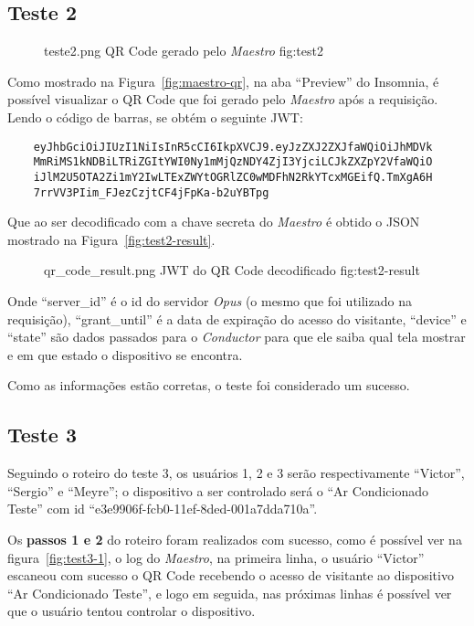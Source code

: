 \subsection{Teste 2}
\begin{figure}[h!]
    {teste2.png}
    {QR Code gerado pelo \emph{Maestro}}
    {fig:test2}
\end{figure}

Como mostrado na Figura~\ref{fig:maestro-qr}, na aba ``Preview'' do Insomnia, é possível visualizar o QR Code que foi gerado pelo \emph{Maestro} após a
requisição. Lendo o código de barras, se obtém o seguinte JWT:\@
\begin{lstlisting}
    eyJhbGciOiJIUzI1NiIsInR5cCI6IkpXVCJ9.eyJzZXJ2ZXJfaWQiOiJhMDVk
    MmRiMS1kNDBiLTRiZGItYWI0Ny1mMjQzNDY4ZjI3YjciLCJkZXZpY2VfaWQiO
    iJlM2U5OTA2Zi1mY2IwLTExZWYtOGRlZC0wMDFhN2RkYTcxMGEifQ.TmXgA6H
    7rrVV3PIim_FJezCzjtCF4jFpKa-b2uYBTpg
\end{lstlisting}

Que ao ser decodificado com a chave secreta do \emph{Maestro} é obtido o JSON mostrado na Figura~\ref{fig:test2-result}.
\begin{figure}[h!]
    {qr_code_result.png}
    {JWT do QR Code decodificado}
    {fig:test2-result}
\end{figure}
Onde ``server\_id'' é o id do servidor \emph{Opus} (o mesmo que foi utilizado na requisição), ``grant\_until'' é a data de expiração do acesso do 
visitante, ``device'' e ``state'' são dados passados para o \emph{Conductor} para que ele saiba qual tela mostrar e em que estado o dispositivo
se encontra.

Como as informações estão corretas, o teste foi considerado um sucesso.

\subsection{Teste 3}
Seguindo o roteiro do teste 3, os usuários 1, 2 e 3 serão respectivamente ``Victor'', ``Sergio'' e ``Meyre''; o dispositivo a ser controlado
será o ``Ar Condicionado Teste'' com id ``e3e9906f-fcb0-11ef-8ded-001a7dda710a''.

Os \textbf{passos 1 e 2} do roteiro foram realizados com sucesso, como é possível ver na figura~\ref{fig:test3-1}, o log do \emph{Maestro}, na primeira linha,
o usuário ``Victor'' escaneou com sucesso o QR Code recebendo o acesso de visitante ao dispositivo ``Ar Condicionado Teste'', e logo em seguida,
nas próximas linhas é possível ver que o usuário tentou controlar o dispositivo.

